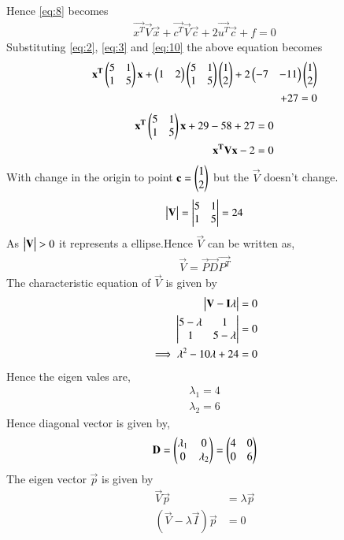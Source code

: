 \documentclass[journal,12pt,twocolumn]{IEEEtran}
\begin{document}
Hence \eqref{eq:8} becomes
\begin{align}
\vec{x^T}\vec{V}\vec{x}+\vec{c^T}\vec{V}\vec{c}+2\vec{u^T}\vec{c}+f = 0 \label{eq:11}
\end{align}
Substituting \eqref{eq:2}, \eqref{eq:3} and \eqref{eq:10} the above equation becomes
\begin{align}
\mathbf{x^T}\begin{pmatrix}5&1\\1&5\end{pmatrix}\mathbf{x}+\begin{pmatrix}1&2\end{pmatrix}\begin{pmatrix}5&1\\1&5\end{pmatrix}\begin{pmatrix}1\\2\end{pmatrix}+2\begin{pmatrix}-7&-11\end{pmatrix}\begin{pmatrix}1\\2\end{pmatrix}\nonumber\\+27 = 0
\end{align}
\begin{align}
\mathbf{x^T}\begin{pmatrix}5&1\\1&5\end{pmatrix}\mathbf{x}+29-58+27=0\\
\mathbf{x^T}\mathbf{V}\mathbf{x}-2 = 0\label{eq:12}
\end{align}
With change in the origin to point $\mathbf{c}=\begin{pmatrix}1\\2\end{pmatrix}$ but the $\vec{V}$ doesn't change.
\begin{align}
\begin{vmatrix}\mathbf{V}\end{vmatrix} = \begin{vmatrix}5&1\\1&5\end{vmatrix} = 24
\end{align}
As $\begin{vmatrix}\mathbf{V}\end{vmatrix} >0$ it represents a ellipse.Hence $\vec{V}$ can be written as,
\begin{align}
\vec{V}=\vec{P}\vec{D}\vec{P^T}\label{eq:13}
\end{align}
 The characteristic equation of $\vec{V}$ is given by
\begin{align}
\begin{vmatrix}\mathbf{V}-\mathbf{I}\lambda\end{vmatrix} = 0\\
\begin{vmatrix}5-\lambda & 1\\1& 5-\lambda\end{vmatrix} =0\\
\implies \lambda^2 - 10\lambda+24 = 0
\end{align}
Hence the eigen vales are,
\begin{align}
\lambda_1 = 4\\
\lambda_2 = 6
\end{align}
Hence diagonal vector is given by,
\begin{align}
\mathbf{D}= \begin{pmatrix}\lambda_1&0\\0&\lambda_2\end{pmatrix} = \begin{pmatrix}4&0\\0&6\end{pmatrix}\label{eq:14}
\end{align}
The eigen vector $\vec{p}$ is given by
\begin{align}
    \vec{V}\vec{p}&=\lambda\vec{p}\\
    (\vec{V}-\lambda\vec{I})\vec{p}&=0
\end{align}
\end{document}
